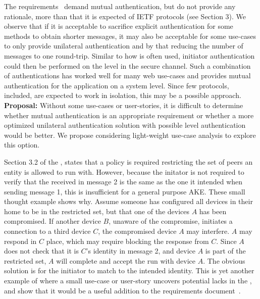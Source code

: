 \documentclass[runningheads]{llncs}
\begin{document}
The requirements~\cite{ietf-lake-reqs-04} demand mutual authentication, but
do not provide any rationale, more than that it is expected of IETF protocols
(see Section 3).
%
We observe that if it is acceptable to sacrifice explicit authentication for
some methods to obtain shorter messages, it may also be acceptable for some
use-cases to only provide unilateral authentication and by that reducing the
number of messages to one round-trip.
%
Similar to how \mTls is often used, initiator authentication could then be
performed on the \mCoap level in the secure \mOscore channel.
%
Such a combination of authentications has worked well for many web
use-cases and provides mutual authentication for the application on a system
level.
%
Since few protocols, \mEdhoc included, are expected to work in isolation, this
may be a possible approach.
%
\textbf{Proposal:} Without some use-cases or user-stories, it is difficult to
determine whether mutual authentication is an appropriate requirement or whether
a more optimized unilateral authentication solution with possible \mCoap level
authentication would be better.
%
We propose considering light-weight use-case analysis to explore this option.
%

Section 3.2 of the \mSpec, states that a policy is required restricting the set
of peers an entity is allowed to run \mEdhoc with.
%
However, because the initator is not required to verify that the \mIdcredr
received in message 2 is the same as the one it intended when sending message 1,
this is insufficient for a general purpose AKE.
%
These small thought example shows why.
%
Assume someone has configured all devices in their home to be in the restricted
set, but that one of the devices $A$ has been compromised.
%
If another device $B$, unaware of the compromise, initiates a connection to a
third device $C$, the compromised device $A$ may interfere.
%
$A$ may respond in $C$ place, which may require blocking the response from $C$.
%
Since $A$ does not check that it is $C$'s identity in message 2, and device $A$
is part of the restricted set, $A$ will complete and accept the \mEdhoc run with
device $A$.
%
The obvious solution is for the initiator to match \mIdcredr to the intended
identity.
%
This is yet another example of where a small use-case or user-story uncovers
potential lacks in the \mSpec, and show that it would be a useful addition to
the requirements document~\cite{ietf-lake-reqs-04}.
%

\end{document}
